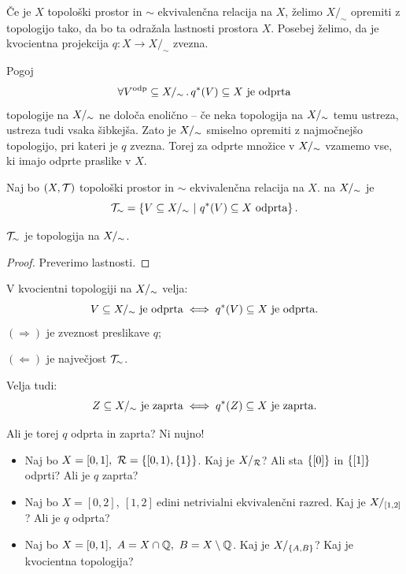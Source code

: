 Če je \(X\) topološki prostor in \(\sim\) ekvivalenčna relacija na \(X\), želimo \(X/_\sim\) opremiti z topologijo tako, da bo ta odražala lastnosti prostora \(X\). Posebej želimo, da je kvocientna projekcija \(q: X \to X/_\sim\) zvezna.

Pogoj \[\forall V^{\text{odp}} \subseteq {X/_\sim} \,.\, q^{*}(V) \subseteq X \ \text{je odprta}\] topologije na \({X/_\sim}\) ne določa enolično -- če neka topologija na \({X/_\sim}\) temu ustreza, ustreza tudi vsaka šibkejša. Zato je \({X/_\sim}\) smiselno opremiti z najmočnejšo topologijo, pri kateri je \(q\) zvezna. Torej za odprte množice v \({X/_\sim}\) vzamemo vse, ki imajo odprte praslike v \(X\).

\begin{definicija}
    Naj bo \((X, \mathcal{T})\) topološki prostor in \(\sim\) ekvivalenčna relacija na \(X\).
     na \({X/_\sim}\) je \[\mathcal{T}_\sim = \left\{V \subseteq {X/_\sim} \ | \ q^{*}(V) \subseteq X \ \text{odprta}\right\}.\]
    
\end{definicija}

\begin{trditev}
    \(\mathcal{T}_\sim\) je topologija na \({X/_\sim}\).
\end{trditev}

\begin{proof}
    Preverimo lastnosti.
\end{proof}

\begin{opomba}
    V kvocientni topologiji na \({X/_\sim}\) velja:
    \[V \subseteq {X/_\sim} \ \text{je odprta} \iff q^{*}(V) \subseteq X \ \text{je odprta}.\]
    \((\Rightarrow)\) je zveznost preslikave \(q\);

    \((\Leftarrow)\) je največjost \(\mathcal{T}_\sim\).

    Velja tudi: 
    \[Z \subseteq \qs{X} \ \text{je zaprta} \liff \invimg{q}(Z) \subseteq X \ \text{je zaprta}.\]
\end{opomba}

\begin{primer}
    Ali je torej \(q\) odprta in zaprta? Ni nujno!
    \begin{itemize}
        \item Naj bo \(X = [0,1], \ \mathcal{R} = \left\{[0, 1), \left\{1\right\}\right\}\). Kaj je \(X/_{\mathcal{R}}\)? Ali sta \(\left\{[0]\right\}\) in \(\left\{[1]\right\}\) odprti? Ali je \(q\) zaprta?
        \item Naj bo \(X = [0,2], \ [1, 2] \ \text{edini netrivialni ekvivalenčni razred}\). Kaj je \(X/_{[1, 2]}\)? Ali je \(q\) odprta?
        \item Naj bo \(X = [0, 1], \ A = X \cap \Q, \ B = X \setminus \Q\). Kaj je \(X/_{\left\{A, B\right\}}\)? Kaj je kvocientna topologija?
    \end{itemize}
\end{primer}

